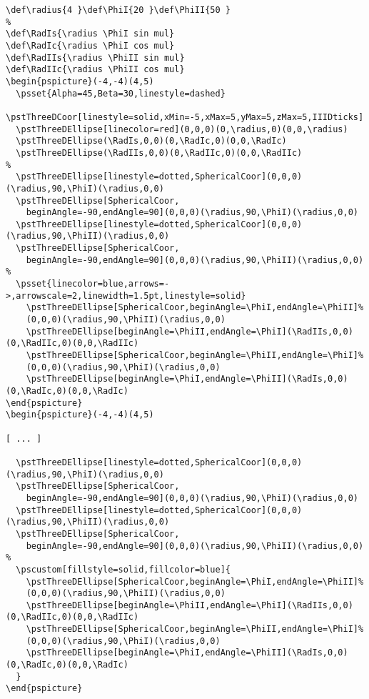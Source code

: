 \documentclass[11pt,english,BCOR10mm,DIV12,bibliography=totoc,parskip=false,smallheadings
    headexclude,footexclude,oneside,dvipsnames,svgnames]{pst-doc}
\begin{document}
\begin{lstlisting}
\def\radius{4 }\def\PhiI{20 }\def\PhiII{50 }
%
\def\RadIs{\radius \PhiI sin mul}
\def\RadIc{\radius \PhiI cos mul}
\def\RadIIs{\radius \PhiII sin mul}
\def\RadIIc{\radius \PhiII cos mul}
\begin{pspicture}(-4,-4)(4,5)
  \psset{Alpha=45,Beta=30,linestyle=dashed}
  \pstThreeDCoor[linestyle=solid,xMin=-5,xMax=5,yMax=5,zMax=5,IIIDticks]
  \pstThreeDEllipse[linecolor=red](0,0,0)(0,\radius,0)(0,0,\radius)
  \pstThreeDEllipse(\RadIs,0,0)(0,\RadIc,0)(0,0,\RadIc)
  \pstThreeDEllipse(\RadIIs,0,0)(0,\RadIIc,0)(0,0,\RadIIc)
%
  \pstThreeDEllipse[linestyle=dotted,SphericalCoor](0,0,0)(\radius,90,\PhiI)(\radius,0,0)
  \pstThreeDEllipse[SphericalCoor,
	beginAngle=-90,endAngle=90](0,0,0)(\radius,90,\PhiI)(\radius,0,0)
  \pstThreeDEllipse[linestyle=dotted,SphericalCoor](0,0,0)(\radius,90,\PhiII)(\radius,0,0)
  \pstThreeDEllipse[SphericalCoor,
	beginAngle=-90,endAngle=90](0,0,0)(\radius,90,\PhiII)(\radius,0,0)
%
  \psset{linecolor=blue,arrows=->,arrowscale=2,linewidth=1.5pt,linestyle=solid}
    \pstThreeDEllipse[SphericalCoor,beginAngle=\PhiI,endAngle=\PhiII]%
	(0,0,0)(\radius,90,\PhiII)(\radius,0,0)
    \pstThreeDEllipse[beginAngle=\PhiII,endAngle=\PhiI](\RadIIs,0,0)(0,\RadIIc,0)(0,0,\RadIIc)
    \pstThreeDEllipse[SphericalCoor,beginAngle=\PhiII,endAngle=\PhiI]%
	(0,0,0)(\radius,90,\PhiI)(\radius,0,0)
    \pstThreeDEllipse[beginAngle=\PhiI,endAngle=\PhiII](\RadIs,0,0)(0,\RadIc,0)(0,0,\RadIc)
\end{pspicture}
\begin{pspicture}(-4,-4)(4,5)

[ ... ]

  \pstThreeDEllipse[linestyle=dotted,SphericalCoor](0,0,0)(\radius,90,\PhiI)(\radius,0,0)
  \pstThreeDEllipse[SphericalCoor,
	beginAngle=-90,endAngle=90](0,0,0)(\radius,90,\PhiI)(\radius,0,0)
  \pstThreeDEllipse[linestyle=dotted,SphericalCoor](0,0,0)(\radius,90,\PhiII)(\radius,0,0)
  \pstThreeDEllipse[SphericalCoor,
	beginAngle=-90,endAngle=90](0,0,0)(\radius,90,\PhiII)(\radius,0,0)
%
  \pscustom[fillstyle=solid,fillcolor=blue]{
    \pstThreeDEllipse[SphericalCoor,beginAngle=\PhiI,endAngle=\PhiII]%
	(0,0,0)(\radius,90,\PhiII)(\radius,0,0)
    \pstThreeDEllipse[beginAngle=\PhiII,endAngle=\PhiI](\RadIIs,0,0)(0,\RadIIc,0)(0,0,\RadIIc)
    \pstThreeDEllipse[SphericalCoor,beginAngle=\PhiII,endAngle=\PhiI]%
	(0,0,0)(\radius,90,\PhiI)(\radius,0,0)
    \pstThreeDEllipse[beginAngle=\PhiI,endAngle=\PhiII](\RadIs,0,0)(0,\RadIc,0)(0,0,\RadIc)
  }
\end{pspicture}
\end{lstlisting}
\end{document}
